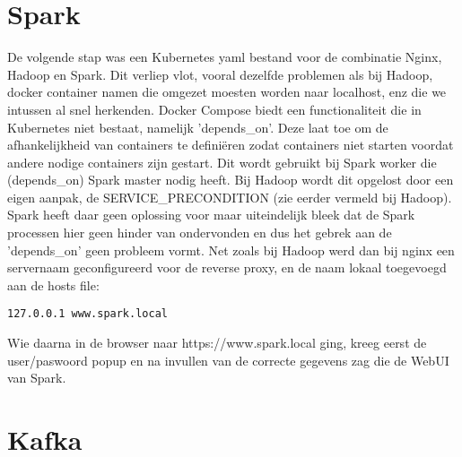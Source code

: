 \section{Spark}

De volgende stap was een Kubernetes yaml bestand voor de combinatie Nginx, Hadoop en Spark. Dit verliep vlot, vooral dezelfde problemen als bij Hadoop, docker container namen die omgezet moesten worden naar localhost, enz die we intussen al snel herkenden.
\newline
\newline
Docker Compose biedt een functionaliteit die in Kubernetes niet bestaat, namelijk 'depends\_on'. Deze laat toe om de afhankelijkheid van containers te definiëren zodat containers niet starten voordat andere nodige containers zijn gestart. Dit wordt gebruikt bij Spark worker die (depends\_on) Spark master nodig heeft.
Bij Hadoop wordt dit opgelost door een eigen aanpak, de SERVICE\_PRECONDITION (zie eerder vermeld bij Hadoop).
\newline
\newline
Spark heeft daar geen oplossing voor maar uiteindelijk bleek dat de Spark processen hier geen hinder van ondervonden en dus het gebrek aan de 'depends\_on' geen probleem vormt.
\newline
\newline
Net zoals bij Hadoop werd dan bij nginx een servernaam geconfigureerd voor de reverse proxy, en de naam lokaal toegevoegd aan de hosts file:
\begin{lstlisting}
127.0.0.1 www.spark.local
\end{lstlisting}

Wie daarna in de browser naar https://www.spark.local ging, kreeg eerst de user/paswoord popup en na invullen van de correcte gegevens zag die de WebUI van Spark.

\section{Kafka}

